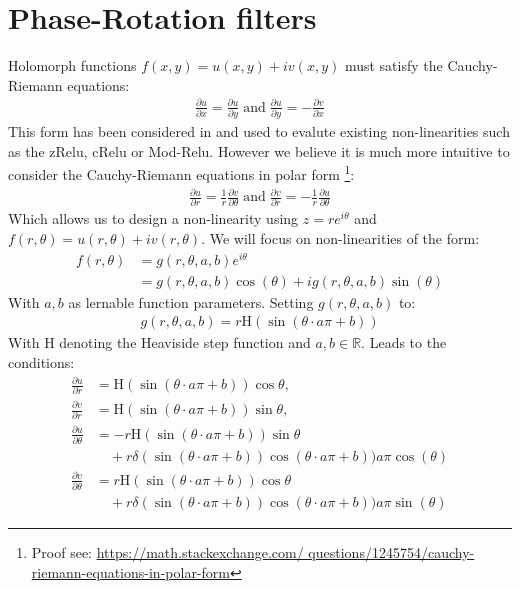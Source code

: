 \documentclass{article}
\begin{document}
\section{Phase-Rotation filters}
Holomorph functions $f(x,y) = u(x,y) + iv(x,y)$ must satisfy the Cauchy-Riemann equations:
\begin{align}
\frac{\partial u}{\partial x} = \frac{\partial u}{\partial y} \; \text{and} \; \frac{\partial u}{\partial y} = -\frac{\partial v}{\partial x}  
\end{align}
This form has been considered in \cite{Trabelsi} and used to evalute existing non-linearities such as the zRelu, cRelu or Mod-Relu. However we believe it is much more intuitive to consider the Cauchy-Riemann equations in polar form \footnote{Proof see: \url{https://math.stackexchange.com/
questions/1245754/cauchy-riemann-equations-in-polar-form}}:
\begin{align}
\frac{\partial u}{\partial r} = \frac{1}{r} \frac{\partial v}{\partial \theta} \; \text{and} \; \frac{\partial v}{\partial r} = - \frac{1}{r} \frac{\partial u}{\partial \theta}
\end{align}
Which allows us to design a non-linearity using $z = re^{i\theta}$ and $f(r,\theta ) = u(r,\theta ) + iv(r,\theta )$. We will focus on non-linearities of the form:
\begin{align}
f(r, \theta) &= g(r,\theta,a,b) e^{i \theta} \\
&= g(r,\theta,a,b)\cos(\theta) + ig(r,\theta,a,b)\sin(\theta)
\end{align}
With $a,b$ as lernable function parameters. Setting $g(r,\theta,a,b)$ to:
\begin{align}
g(r,\theta,a,b) = r \text{H}(\sin (\theta \cdot a\pi + b))
\label{eq:PhaseRelu}
\end{align}
With H denoting the Heaviside step function and $a,b \in \mathbb{R}$. Leads to the conditions:
\begin{align}
\frac{\partial u}{\partial r} &= \text{H}(\sin (\theta \cdot a\pi + b)) \cos \theta, \\ 
\frac{\partial v}{\partial r} &= \text{H}(\sin (\theta \cdot a\pi + b)) \sin \theta, \\
\frac{\partial u}{\partial \theta} &= -r \text{H}(\sin (\theta \cdot a\pi + b)) \sin \theta \nonumber \\
&\quad + r \delta(\sin (\theta \cdot a\pi + b)) \cos(\theta \cdot a\pi + b))a\pi \cos(\theta)\\ 
\frac{\partial v}{\partial \theta} &= r \text{H}(\sin (\theta \cdot a\pi + b)) \cos \theta \nonumber \\
&\quad + r \delta(\sin (\theta \cdot a\pi + b)) \cos(\theta \cdot a\pi + b))a\pi \sin(\theta)
\end{align}
\end{document}
